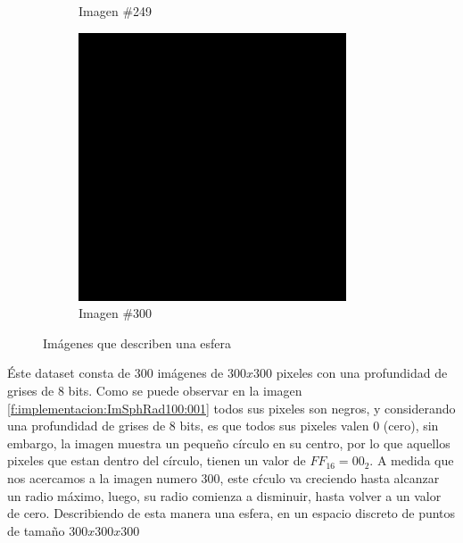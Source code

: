 \begin{figure}
\begin{subfigure}{0.30\textwidth}
		\caption{Imagen \#249}
		\label{f:implementacion:ImSphRad100:249}
	\end{subfigure}
	\begin{subfigure}{0.30\textwidth}
		\centering
		\includegraphics[width=\textwidth]{images/datasets/ImSphRad100/Sphere300.png}
		\caption{Imagen \#300}
		\label{f:implementacion:ImSphRad100:300}
	\end{subfigure}

	\caption{Imágenes que describen una esfera}
	\label{f:implementacion:dataset:ImSphRad100}
\end{figure}

Éste dataset consta de 300 imágenes de $300 x 300$ pixeles con una profundidad de grises de 8 bits. Como se puede observar en la imagen \ref{f:implementacion:ImSphRad100:001} todos sus pixeles son negros, y considerando una profundidad de grises de 8 bits, es que todos sus pixeles valen $0$ (cero), sin embargo, la imagen \label{f:implementacion:ImSphRad100:051} muestra un pequeño círculo en su centro, por lo que aquellos pixeles que estan dentro del círculo, tienen un valor de $FF_{16} = 00_{2}$. A medida que nos acercamos a la imagen numero 300, este cŕculo va creciendo hasta alcanzar un radio máximo, luego, su radio comienza a disminuir, hasta volver a un valor de cero. Describiendo de esta manera una esfera, en un espacio discreto de puntos de tamaño $300 x 300 x 300$


